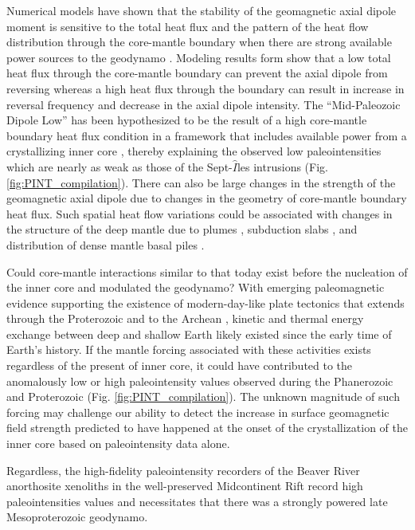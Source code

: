 \documentclass[9pt,twocolumn,twoside,lineno]{pnas-new}
\begin{document}
Numerical models have shown that the stability of the geomagnetic axial dipole moment is sensitive to the total heat flux and the pattern of the heat flow distribution through the core-mantle boundary when there are strong available power sources to the geodynamo \cite{Glatzmaier1999a, Olson2007a, Olson2010a}. Modeling results form \cite{Olson2010a} show that a low total heat flux through the core-mantle boundary can prevent the axial dipole from reversing whereas a high heat flux through the boundary can result in increase in reversal frequency and decrease in the axial dipole intensity. The ``Mid-Paleozoic Dipole Low'' has been hypothesized to be the result of a high core-mantle boundary heat flux condition in a framework that includes available power from a crystallizing inner core \cite{Hawkins2019a}, thereby explaining the observed low paleointensities which are nearly as weak as those of the Sept-$\hat{I}$les intrusions \cite{Bono2019a} (Fig. \ref{fig:PINT_compilation}). There can also be large changes in the strength of the geomagnetic axial dipole due to changes in the geometry of core-mantle boundary heat flux. Such spatial heat flow variations could be associated with changes in the structure of the deep mantle due to plumes \cite{Larson1991a, Courtillot2007a}, subduction slabs \cite{Tan2002b, Hounslow2018a}, and distribution of dense mantle basal piles \cite{Biggin2012a}.

Could core-mantle interactions similar to that today exist before the nucleation of the inner core and modulated the geodynamo? With emerging paleomagnetic evidence supporting the existence of modern-day-like plate tectonics that extends through the Proterozoic \cite{Swanson-Hysell2021c} and to the Archean \cite{Mitchell2014a}, kinetic and thermal energy exchange between deep and shallow Earth likely existed since the early time of Earth's history. If the mantle forcing associated with these activities exists regardless of the present of inner core, it could have contributed to the anomalously low or high paleointensity values observed during the Phanerozoic and Proterozoic (Fig. \ref{fig:PINT_compilation}). The unknown magnitude of such forcing may challenge our ability to detect the increase in surface geomagnetic field strength predicted to have happened at the onset of the crystallization of the inner core \cite{Davies2021a} based on paleointensity data alone. 

Regardless, the high-fidelity paleointensity recorders of the Beaver River anorthosite xenoliths in the well-preserved Midcontinent Rift record high paleointensities values and necessitates that there was a strongly powered late Mesoproterozoic geodynamo. 
\end{document}
